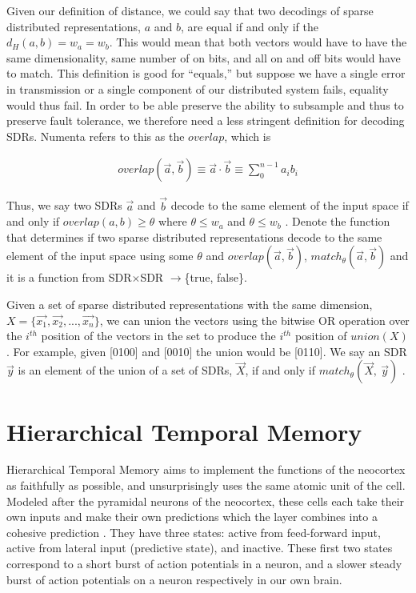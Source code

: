 \documentclass[oneside,12pt,openany]{book}
\begin{document}
	Given our definition of distance, we could say that two decodings of sparse distributed representations, $a$ and $b$, are equal if and only if the $d_{H}(a,b) = w_{a} = w_{b}$. This would mean that both vectors would have to have the same dimensionality, same number of on bits, and all on and off bits would have to match. This definition is good for ``equals,'' but suppose we have a single error in transmission or a single component of our distributed system fails, equality would thus fail. In order to be able preserve the ability to subsample and thus to preserve fault tolerance, we therefore need a less stringent definition for decoding SDRs. Numenta refers to this as the $overlap$, which is 
	
	\begin{align}
	\label{eqn:overlap}
		overlap(\overrightarrow{a}, \overrightarrow{b}) \equiv \overrightarrow{a} \cdot \overrightarrow{b} \equiv \sum_{0}^{n-1} a_{i}b_{i}
	\end{align}
	
	
	 Thus, we say two SDRs $\overrightarrow{a}$ and $\overrightarrow{b}$ decode to the same element of the input space if and only if $overlap(a,b) \geq \theta$ where $\theta \leq w_{a}$ and $\theta \leq w_{b}$ \cite{Properties}. Denote the function that determines if two sparse distributed representations decode to the same element of the input space using some $\theta$ and $overlap(\overrightarrow{a}, \overrightarrow{b})$, $match_{\theta}(\overrightarrow{a}, \overrightarrow{b})$ and it is a function from SDR$\times$SDR $\longrightarrow$\{true, false\}.
	
	Given a set of sparse distributed representations with the same dimension, $X =\{\overrightarrow{x_{1}}, \overrightarrow{x_{2}}, ...,\overrightarrow{x_{n}}\}$, we can union the vectors using the bitwise OR operation over the $i^{th}$ position of the vectors in the set to produce the $i^{th}$ position of $union(X)$ \cite{Properties}. For example, given [0100] and [0010] the union would be [0110]. We say an SDR $\overrightarrow{y}$ is an element of the union of a set of SDRs, $\overrightarrow{X}$, if and only if $match_{\theta}(\overrightarrow{X},\ \overrightarrow{y})$ \cite{Properties}.
	
	\section{Hierarchical Temporal Memory}
	
	Hierarchical Temporal Memory aims to implement the functions of the neocortex as faithfully as possible, and unsurprisingly uses the same atomic unit of the cell. Modeled after the pyramidal neurons of the neocortex, these cells each take their own inputs and make their own predictions which the layer combines into a cohesive prediction \cite{Whitepaper}. They have three states: active from feed-forward input, active from lateral input (predictive state), and inactive. These first two states correspond to a short burst of action potentials in a neuron, and a slower steady burst of action potentials on a neuron respectively in our own brain.
	
\end{document}
